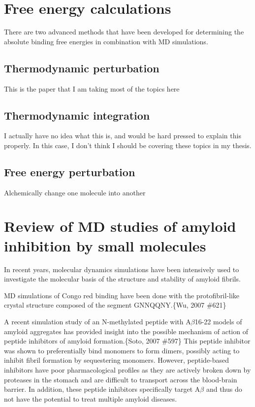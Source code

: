 \section{Free energy calculations}
There are two advanced methods that have been developed for determining the absolute binding free energies in combination with MD simulations.

\subsection{Thermodynamic perturbation}
This is the paper that I am taking most of the topics here\cite{Gilson:2007hz}

\subsection{Thermodynamic integration}
I actually have no idea what this is, and would be hard pressed to explain this properly.
In this case, I don't think I should be covering these topics in my thesis.

\subsection{Free energy perturbation}
Alchemically change one molecule into another

\section{Review of MD studies of amyloid inhibition by small molecules}

\begin{outline}
	\1 In recent years, molecular dynamics simulations have been intensively used to investigate the molecular basis of the structure and stability of amyloid fibrils. 
	
	\1 MD simulations of Congo red binding have been done with the protofibril-like crystal structure composed of the segment GNNQQNY.\{Wu, 2007 \#621\}
	
	\1 A recent simulation study of an N-methylated peptide with A$\beta$16-22 models of amyloid aggregates has provided insight into the possible mechanism of action of peptide inhibitors of amyloid formation.\{Soto, 2007 \#597\} This peptide inhibitor was shown to preferentially bind monomers to form dimers, possibly acting to inhibit fibril formation by sequestering monomers. However, peptide-based inhibitors have poor pharmacological profiles as they are actively broken down by proteases in the stomach and are difficult to transport across the blood-brain barrier. In addition, these peptide inhibitors specifically target A$\beta$ and thus do not have the potential to treat multiple amyloid diseases.
\end{outline}

